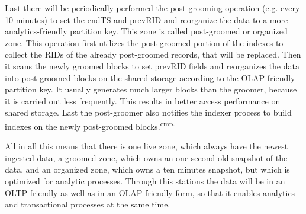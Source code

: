 Last there will be periodically performed the post-grooming operation (e.g. every 10 minutes) to set the endTS and prevRID and reorganize the data to a more analytics-friendly partition key. This zone is called post-groomed or organized zone. This operation first utilizes the post-groomed portion of the indexes to collect the RIDs of the already post-groomed records, that will be replaced. Then it scans the newly groomed blocks to set prevRID fields and reorganizes the data into post-groomed blocks on the shared storage according to the OLAP friendly partition key. It usually generates much larger blocks than the groomer, because it is carried out less frequently. This results in better access performance on shared storage. Last the post-groomer also notifies the indexer process to build indexes on the newly post-groomed blocks.\textsuperscript{cmp.\cite{30}}

All in all this means that there is one live zone, which always have the newest ingested data, a groomed zone, which owns an one second old snapshot of the data, and an organized zone, which owns a ten minutes snapshot, but which is optimized for analytic processes. Through this stations the data will be in an OLTP-friendly as well as in an OLAP-friendly form, so that it enables analytics and transactional processes at the same time. 


